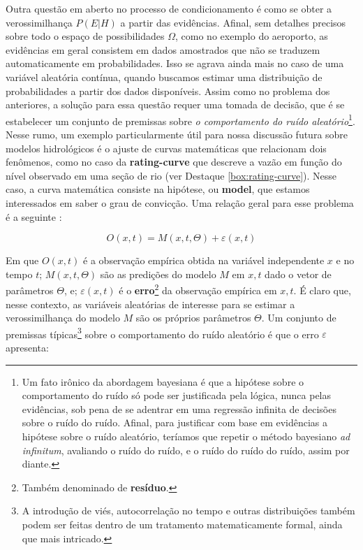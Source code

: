 \documentclass[./main.tex]{subfiles}
\begin{document}
\par Outra questão em aberto no processo de condicionamento é como se obter a verossimilhança $P(E | H)$ a partir das evidências. Afinal, sem detalhes precisos sobre todo o espaço de possibilidades $\Omega$, como no exemplo do aeroporto, as evidências em geral consistem em dados amostrados que não se traduzem automaticamente em probabilidades. Isso se agrava ainda mais no caso de uma variável aleatória contínua, quando buscamos estimar uma distribuição de probabilidades a partir dos dados disponíveis. Assim como no problema dos anteriores, a solução para essa questão requer uma tomada de decisão, que é se estabelecer um conjunto de premissas sobre \textit{o comportamento do ruído aleatório}\footnote{Um fato irônico da abordagem bayesiana é que a hipótese sobre o comportamento do ruído só pode ser justificada pela lógica, nunca pelas evidências, sob pena de se adentrar em uma regressão infinita de decisões sobre o ruído do ruído. Afinal, para justificar com base em evidências a hipótese sobre o ruído aleatório, teríamos que repetir o método bayesiano \textit{ad infinitum}, avaliando o ruído do ruído, e o ruído do ruído do ruído, assim por diante.}. Nesse rumo, um exemplo particularmente útil para nossa discussão futura sobre modelos hidrológicos é o ajuste de curvas matemáticas que relacionam dois fenômenos, como no caso da \textbf{\gls{rating-curve}} que descreve a vazão em função do nível observado em uma seção de rio (ver Destaque \ref{box:rating-curve}).  Nesse caso, a curva matemática consiste na hipótese, ou \textbf{\gls{model}}, que estamos interessados em saber o grau de convicção.  Uma relação geral para esse problema é a seguinte \cite{Box1979}:
\begin{linenomath*}
\begin{equation}
\label{eq:bayes-model}
    O(x, t) = M(x, t, \Theta) + \varepsilon(x, t)
\end{equation}
\end{linenomath*}
Em que $O(x, t)$ é a observação empírica obtida na variável independente $x$ e no tempo $t$; $M(x, t, \Theta)$ são as predições do modelo $M$ em $x,t$ dado o vetor de parâmetros $\Theta$, e; $\varepsilon(x, t)$ é o \textbf{erro}\footnote{Também denominado de \textbf{resíduo}.} da observação empírica em $x,t$. É claro que, nesse contexto, as variáveis aleatórias de interesse para se estimar a verossimilhança do modelo $M$ são os próprios parâmetros $\Theta$. Um conjunto de premissas típicas\footnote{A introdução de viés, autocorrelação no tempo e outras distribuições também podem ser feitas dentro de um tratamento matematicamente formal, ainda que mais intricado.} sobre o comportamento do ruído aleatório é que o erro $\varepsilon$ apresenta:
\end{document}
